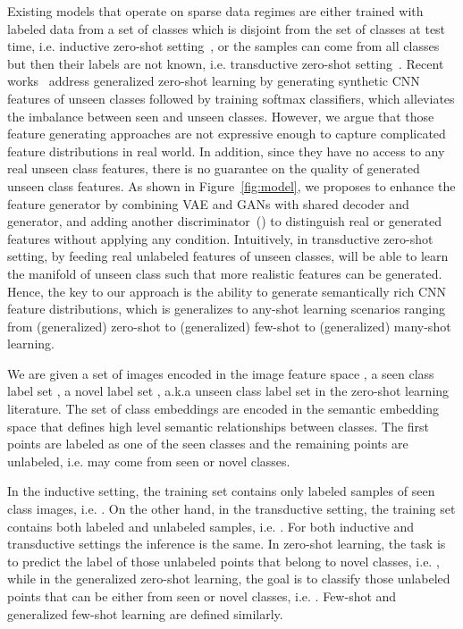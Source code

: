 \documentclass[10pt,twocolumn,letterpaper]{article}
\newcommand{\myparagraph}[1]{\vspace{5pt}\noindent{\bf #1}}
\begin{document}
Existing models that operate on sparse data regimes are either trained with labeled data from a set of classes which is disjoint from the set of classes at test time, i.e. inductive zero-shot setting~\cite{LNH13,FCSBDRM13}, or the samples can come from all classes but then their labels are not known, i.e. transductive zero-shot setting~\cite{FHXG15,MES13}. Recent works~\cite{XLSA18,Verma_2018_CVPR,FKRC18} address generalized zero-shot learning by generating synthetic CNN features of unseen classes followed by training softmax classifiers, which alleviates the imbalance between seen and unseen classes. However, we argue that those feature generating approaches are not expressive enough to capture complicated feature distributions in real world. In addition, since they have no access to any real unseen class features, there is no guarantee on the quality of generated unseen class features. As shown in Figure~\ref{fig:model}, we proposes to enhance the feature generator by combining VAE and GANs with shared decoder and generator, and adding another discriminator~() to distinguish real or generated features without applying any condition. Intuitively, in transductive zero-shot setting, by feeding real unlabeled features of unseen classes,  will be able to learn the manifold of unseen class such that more realistic features can be generated.
Hence, the key to our approach is the ability to generate semantically rich CNN feature distributions, which is generalizes to any-shot learning scenarios ranging from (generalized) zero-shot to (generalized) few-shot to (generalized) many-shot learning.

\myparagraph{Setup.}
We are given a set of images  encoded in the image feature space , a seen class label set , a novel label set , a.k.a unseen class label set  in the zero-shot learning literature. The set of class embeddings   are encoded in the semantic embedding space  that defines high level semantic relationships between classes. The first  points  are labeled as one of the seen classes  and the remaining points  are unlabeled, i.e. may come from seen or novel classes. 

In the inductive setting, the training set contains only labeled samples of seen class images, i.e. . On the other hand, in the transductive setting, the training set contains both labeled and unlabeled samples, i.e. . For both inductive and transductive settings the inference is the same. In zero-shot learning, the task is to predict the label of those unlabeled points that belong to novel classes, i.e. , while in the generalized zero-shot learning, the goal is to classify those unlabeled points that can be either from seen or novel classes, i.e. . Few-shot and generalized few-shot learning are defined similarly. 
\end{document}
